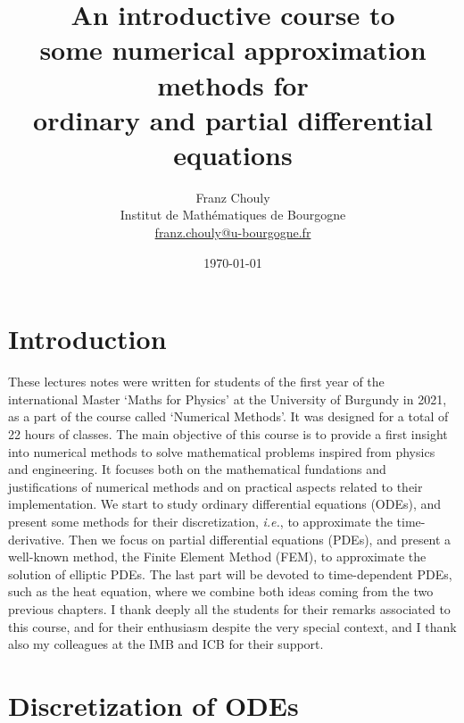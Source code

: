 \documentclass{article}
\title{An introductive course to\\some  numerical approximation methods for \\ ordinary and partial differential equations} %
\author{Franz Chouly \\[1em] Institut de Mathématiques de Bourgogne \\ \url{franz.chouly@u-bourgogne.fr}}
\date{\today}
\begin{document}
\maketitle

\newpage

\section*{Introduction}

These lectures notes were written for students of the first year of the international Master `Maths for Physics' at the University of Burgundy in 2021, as a part of the course called `Numerical Methods'. It was designed for a total of 22 hours of classes.
%
%
The main objective of this course is to provide a first insight into numerical methods to solve mathematical problems inspired from physics and engineering. It focuses both on the mathematical fundations and justifications of numerical methods and on practical aspects related to their implementation. We start to study ordinary differential equations (ODEs), and present some methods for their discretization, \emph{i.e.}, to approximate the time-derivative. Then we focus on partial differential equations (PDEs), and present a well-known method, the Finite Element Method (FEM), to approximate the solution of elliptic PDEs. The last part will be devoted to time-dependent PDEs, such as the heat equation, where we combine both ideas coming from the two previous chapters.
%
I thank deeply all the students for their remarks associated to this course, and for their enthusiasm despite the very special context, and I thank also my colleagues at the IMB and ICB for their support.


\tableofcontents

\newpage

\section{Discretization of ODEs}
\end{document}
